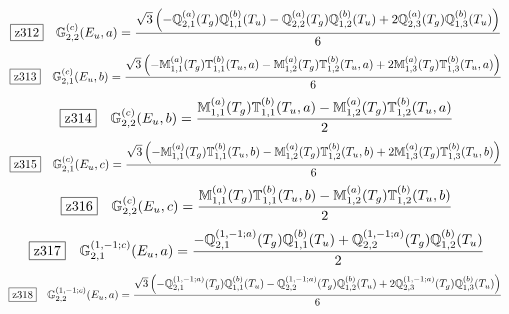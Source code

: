\documentclass[fleqn,10pt,landscape]{jsarticle}
\begin{document}
\begin{dmath*}
\hspace*{3mm}\fbox{z312}\quad \mathbb{G}_{2,2}^{(c)}(E_{u},a)=\frac{\sqrt{3} \left(- \mathbb{Q}_{2,1}^{(a)}(T_{g}) \mathbb{Q}_{1,1}^{(b)}(T_{u}) - \mathbb{Q}_{2,2}^{(a)}(T_{g}) \mathbb{Q}_{1,2}^{(b)}(T_{u}) + 2 \mathbb{Q}_{2,3}^{(a)}(T_{g}) \mathbb{Q}_{1,3}^{(b)}(T_{u})\right)}{6}
\end{dmath*}
\begin{dmath*}
\hspace*{3mm}\fbox{z313}\quad \mathbb{G}_{2,1}^{(c)}(E_{u},b)=\frac{\sqrt{3} \left(- \mathbb{M}_{1,1}^{(a)}(T_{g}) \mathbb{T}_{1,1}^{(b)}(T_{u},a) - \mathbb{M}_{1,2}^{(a)}(T_{g}) \mathbb{T}_{1,2}^{(b)}(T_{u},a) + 2 \mathbb{M}_{1,3}^{(a)}(T_{g}) \mathbb{T}_{1,3}^{(b)}(T_{u},a)\right)}{6}
\end{dmath*}
\begin{dmath*}
\hspace*{3mm}\fbox{z314}\quad \mathbb{G}_{2,2}^{(c)}(E_{u},b)=\frac{\mathbb{M}_{1,1}^{(a)}(T_{g}) \mathbb{T}_{1,1}^{(b)}(T_{u},a) - \mathbb{M}_{1,2}^{(a)}(T_{g}) \mathbb{T}_{1,2}^{(b)}(T_{u},a)}{2}
\end{dmath*}
\begin{dmath*}
\hspace*{3mm}\fbox{z315}\quad \mathbb{G}_{2,1}^{(c)}(E_{u},c)=\frac{\sqrt{3} \left(- \mathbb{M}_{1,1}^{(a)}(T_{g}) \mathbb{T}_{1,1}^{(b)}(T_{u},b) - \mathbb{M}_{1,2}^{(a)}(T_{g}) \mathbb{T}_{1,2}^{(b)}(T_{u},b) + 2 \mathbb{M}_{1,3}^{(a)}(T_{g}) \mathbb{T}_{1,3}^{(b)}(T_{u},b)\right)}{6}
\end{dmath*}
\begin{dmath*}
\hspace*{3mm}\fbox{z316}\quad \mathbb{G}_{2,2}^{(c)}(E_{u},c)=\frac{\mathbb{M}_{1,1}^{(a)}(T_{g}) \mathbb{T}_{1,1}^{(b)}(T_{u},b) - \mathbb{M}_{1,2}^{(a)}(T_{g}) \mathbb{T}_{1,2}^{(b)}(T_{u},b)}{2}
\end{dmath*}
\begin{dmath*}
\hspace*{3mm}\fbox{z317}\quad \mathbb{G}_{2,1}^{(1,-1;c)}(E_{u},a)=\frac{- \mathbb{Q}_{2,1}^{(1,-1;a)}(T_{g}) \mathbb{Q}_{1,1}^{(b)}(T_{u}) + \mathbb{Q}_{2,2}^{(1,-1;a)}(T_{g}) \mathbb{Q}_{1,2}^{(b)}(T_{u})}{2}
\end{dmath*}
\begin{dmath*}
\hspace*{3mm}\fbox{z318}\quad \mathbb{G}_{2,2}^{(1,-1;c)}(E_{u},a)=\frac{\sqrt{3} \left(- \mathbb{Q}_{2,1}^{(1,-1;a)}(T_{g}) \mathbb{Q}_{1,1}^{(b)}(T_{u}) - \mathbb{Q}_{2,2}^{(1,-1;a)}(T_{g}) \mathbb{Q}_{1,2}^{(b)}(T_{u}) + 2 \mathbb{Q}_{2,3}^{(1,-1;a)}(T_{g}) \mathbb{Q}_{1,3}^{(b)}(T_{u})\right)}{6}
\end{dmath*}
\end{document}
